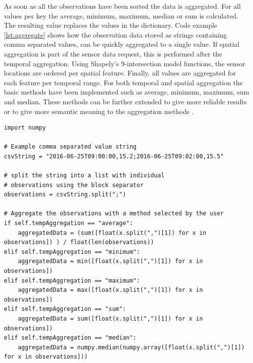 As soon as all the observations have been sorted the data is aggregated. For all values per key the average, minimum, maximum, median or sum is calculated. The resulting value replaces the values in the dictionary. Code example \ref{lst:aggregate} shows how the observation data stored as strings containing comma separated values, can be quickly aggregated to a single value. If spatial aggregation is part of the sensor data request, this is performed after the temporal aggregation. Using Shapely's 9-intersection model functions, the sensor locations are ordered per spatial feature. Finally, all values are aggregated for each feature per temporal range. For both temporal and spatial aggregation the basic methods have been implemented such as average, minimum, maximum, sum and median. These methods can be further extended to give more reliable results \citep{SW:Ganesan} or to give more semantic meaning to the aggregation methods \citep{SSW:Stasch4}.         


\begin{lstlisting}[float,caption={Script that performs basic temporal aggregation methods on a comma separated value string}, label={lst:aggregate}]
import numpy

# Example comma separated value string 
csvString = "2016-06-25T09:00:00,15.2;2016-06-25T09:02:00,15.5"

# split the string into a list with individual 
# observations using the block separator 
observations = csvString.split(";")

# Aggregate the observations with a method selected by the user
if self.tempAggregation == "average":
	aggregatedData = (sum([float(x.split(",")[1]) for x in observations]) ) / float(len(observations))
elif self.tempAggregation == "minimum":
	aggregatedData = min([float(x.split(",")[1]) for x in observations])
elif self.tempAggregation == "maximum":
	aggregatedData = max([float(x.split(",")[1]) for x in observations])
elif self.tempAggregation == "sum":
	aggregatedData = sum([float(x.split(",")[1]) for x in observations])
elif self.tempAggregation == "median":
	aggregatedData = numpy.median(numpy.array([float(x.split(",")[1]) for x in observations]))
\end{lstlisting}


